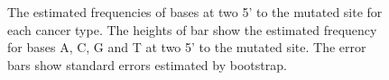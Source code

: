\begin{figure}[b]
\quad
{}
  
\caption{The estimated frequencies of bases at two 5' to the mutated site for each cancer type.
The heights of bar show the estimated frequency for bases A, C, G and T at two 5' to the mutated site.
The error bars show standard errors estimated by bootstrap.}
\label{two5prime}

\end{figure}


  
  

      
